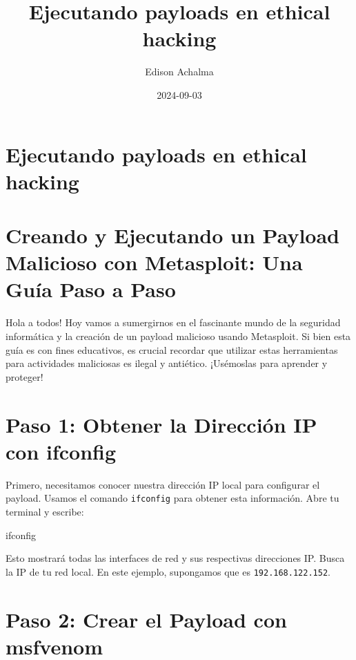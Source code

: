 \documentclass[
  jou,
  floatsintext,
  longtable,
  a4paper,
  nolmodern,
  notxfonts,
  notimes,
  12pt,
  colorlinks=true,linkcolor=blue,citecolor=blue,urlcolor=blue]{apa7}
\title{Ejecutando payloads en ethical hacking}
\author{Edison Achalma}
\affiliation{
{Escuela Profesional de Economía, Universidad Nacional de San Cristóbal
de Huamanga}}
\date{2024-09-03}
\newenvironment{Shaded}{\begin{snugshade}}{\end{snugshade}}
\newcommand{\ExtensionTok}[1]{\textcolor[rgb]{0.00,0.23,0.31}{#1}}
\begin{document}
\maketitle


\hypertarget{toc}{}
\tableofcontents
\newpage
\section[Introduction]{Ejecutando payloads en ethical hacking}

\setcounter{secnumdepth}{3}

\setlength\LTleft{0pt}




\section{Creando y Ejecutando un Payload Malicioso con Metasploit: Una
Guía Paso a
Paso}\label{creando-y-ejecutando-un-payload-malicioso-con-metasploit-una-guuxeda-paso-a-paso}

Hola a todos! Hoy vamos a sumergirnos en el fascinante mundo de la
seguridad informática y la creación de un payload malicioso usando
Metasploit. Si bien esta guía es con fines educativos, es crucial
recordar que utilizar estas herramientas para actividades maliciosas es
ilegal y antiético. ¡Usémoslas para aprender y proteger!

\section{Paso 1: Obtener la Dirección IP con
ifconfig}\label{paso-1-obtener-la-direcciuxf3n-ip-con-ifconfig}

Primero, necesitamos conocer nuestra dirección IP local para configurar
el payload. Usamos el comando \texttt{ifconfig} para obtener esta
información. Abre tu terminal y escribe:

\begin{Shaded}
\begin{Highlighting}[]
\ExtensionTok{ifconfig}
\end{Highlighting}
\end{Shaded}

Esto mostrará todas las interfaces de red y sus respectivas direcciones
IP. Busca la IP de tu red local. En este ejemplo, supongamos que es
\texttt{192.168.122.152}.

\section{Paso 2: Crear el Payload con
msfvenom}\label{paso-2-crear-el-payload-con-msfvenom}
\end{document}
